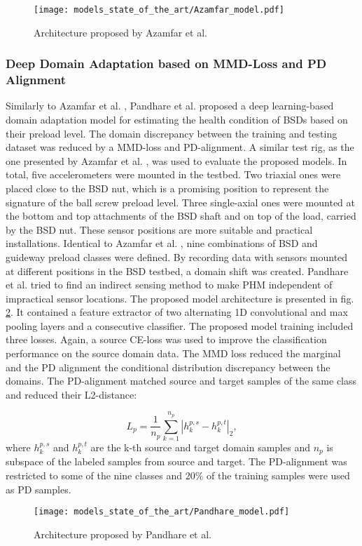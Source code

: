 \begin{figure}[H]
  \centering
  \texttt{[image: models\_state\_of\_the\_art/Azamfar\_model.pdf]}
  \caption{Architecture proposed by Azamfar et al. \cite{AZAMFAR2020103932}}
  \label{fig:Azamfar_model}
\end{figure}


\subsubsection{Deep Domain Adaptation based on MMD-Loss and PD Alignment}
Similarly to Azamfar et al. \cite{AZAMFAR2020103932}, Pandhare et al. \cite{Pandhare2021} proposed a deep learning-based domain adaptation model for estimating the health condition of BSDs based on their preload level. The domain discrepancy between the training and testing dataset was reduced by a MMD-loss and PD-alignment. A similar test rig, as the one presented by Azamfar et al. \cite{AZAMFAR2020103932}, was used to evaluate the proposed models. In total, five accelerometers were mounted in the testbed. Two triaxial ones were placed close to the BSD nut, which is a promising position to represent the signature of the ball screw preload level. Three single-axial ones were mounted at the bottom and top attachments of the BSD shaft and on top of the load, carried by the BSD nut. These sensor positions are more suitable and practical installations. Identical to Azamfar et al. \cite{AZAMFAR2020103932}, nine combinations of BSD and guideway preload classes were defined. By recording data with sensors mounted at different positions in the BSD testbed, a domain shift was created. Pandhare et al. \cite{Pandhare2021} tried to find an indirect sensing method to make PHM independent of impractical sensor locations. The proposed model architecture is presented in fig. \ref{fig:Pandhare_model}. It contained a feature extractor of two alternating 1D convolutional and max pooling layers and a consecutive classifier. The proposed model training included three losses. Again, a source CE-loss was used to improve the classification performance on the source domain data. The MMD loss reduced the marginal and the PD alignment the conditional distribution discrepancy between the domains. The PD-alignment matched source and target samples of the same class and reduced their L2-distance: 

\begin{equation}
    L_{p} = \frac{1}{n_{p}}\sum_{k=1}^{n_{p}}|h_{k}^{p,s}-h_{k}^{p,t}|_{2}, 
\end{equation}
where $h_{k}^{p,s}$ and $h_{k}^{p,t}$ are the k-th source and target domain samples and $n_{p}$ is subspace of the labeled samples from source and target. The PD-alignment was restricted to some of the nine classes and 20\% of the training samples were used as PD samples.
\begin{figure}[H]
  \centering
  \texttt{[image: models\_state\_of\_the\_art/Pandhare\_model.pdf]}
  \caption{Architecture proposed by Pandhare et al. \cite{Pandhare2021}}
  \label{fig:Pandhare_model}
\end{figure}

